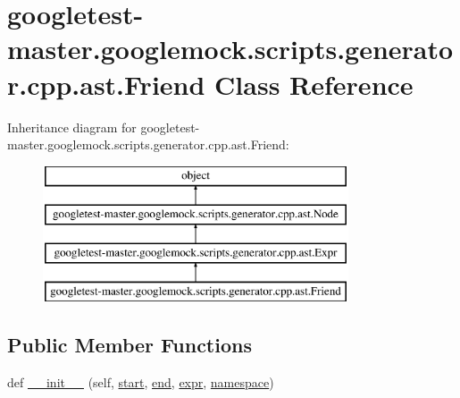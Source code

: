 \hypertarget{classgoogletest-master_1_1googlemock_1_1scripts_1_1generator_1_1cpp_1_1ast_1_1_friend}{}\section{googletest-\/master.googlemock.\+scripts.\+generator.\+cpp.\+ast.\+Friend Class Reference}
\label{classgoogletest-master_1_1googlemock_1_1scripts_1_1generator_1_1cpp_1_1ast_1_1_friend}
Inheritance diagram for googletest-\/master.googlemock.\+scripts.\+generator.\+cpp.\+ast.\+Friend\+:\begin{figure}[H]
\begin{center}
\leavevmode
\includegraphics[height=4.000000cm]{dc/d2b/classgoogletest-master_1_1googlemock_1_1scripts_1_1generator_1_1cpp_1_1ast_1_1_friend}
\end{center}
\end{figure}
\subsection*{Public Member Functions}
\begin{DoxyCompactItemize}
\item 
def \mbox{\hyperlink{classgoogletest-master_1_1googlemock_1_1scripts_1_1generator_1_1cpp_1_1ast_1_1_friend_a7d308c1cb29ac51dd09e2a7d49220e9f}{\+\_\+\+\_\+init\+\_\+\+\_\+}} (self, \mbox{\hyperlink{classgoogletest-master_1_1googlemock_1_1scripts_1_1generator_1_1cpp_1_1ast_1_1_node_a6f9eb279a989f9ca27e7d0f1975336d1}{start}}, \mbox{\hyperlink{classgoogletest-master_1_1googlemock_1_1scripts_1_1generator_1_1cpp_1_1ast_1_1_node_a747e90ade89c1764e83b5b649bde18cc}{end}}, \mbox{\hyperlink{classgoogletest-master_1_1googlemock_1_1scripts_1_1generator_1_1cpp_1_1ast_1_1_expr_a4a7e7c2a767673d1476a6cb0e4fadff1}{expr}}, \mbox{\hyperlink{classgoogletest-master_1_1googlemock_1_1scripts_1_1generator_1_1cpp_1_1ast_1_1_friend_a8006bc202e1a22e1eb3ecbbac7d1ed8d}{namespace}})
\end{DoxyCompactItemize}
